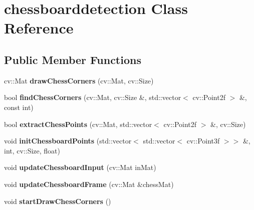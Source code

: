 \hypertarget{classchessboarddetection}{}\section{chessboarddetection Class Reference}
\label{classchessboarddetection}
\subsection*{Public Member Functions}
\begin{DoxyCompactItemize}
\item 
\mbox{\label{classchessboarddetection_a97a4a30faf0bc990686236cd20d060f7}} 
cv\+::\+Mat {\bfseries draw\+Chess\+Corners} (cv\+::\+Mat, cv\+::\+Size)
\item 
\mbox{\label{classchessboarddetection_abc71ee623021de8ec3e937ceba2decf6}} 
bool {\bfseries find\+Chess\+Corners} (cv\+::\+Mat, cv\+::\+Size \&, std\+::vector$<$ cv\+::\+Point2f $>$ \&, const int)
\item 
\mbox{\label{classchessboarddetection_ac99285780391f2803536cb1177a6b951}} 
bool {\bfseries extract\+Chess\+Points} (cv\+::\+Mat, std\+::vector$<$ cv\+::\+Point2f $>$ \&, cv\+::\+Size)
\item 
\mbox{\label{classchessboarddetection_a5c646bf4acc8967358448aac7cfe5f16}} 
void {\bfseries init\+Chessboard\+Points} (std\+::vector$<$ std\+::vector$<$ cv\+::\+Point3f $>$$>$ \&, int, cv\+::\+Size, float)
\item 
\mbox{\label{classchessboarddetection_a0c48bc927ef7caec1e049fca3a1ecbf3}} 
void {\bfseries update\+Chessboard\+Input} (cv\+::\+Mat in\+Mat)
\item 
\mbox{\label{classchessboarddetection_a26c7ffac178495467c64eee54e82ae7b}} 
void {\bfseries update\+Chessboard\+Frame} (cv\+::\+Mat \&chess\+Mat)
\item 
\mbox{\label{classchessboarddetection_afd6c4ed618830c083227edeb0625cc68}} 
void {\bfseries start\+Draw\+Chess\+Corners} ()
\item 
$$
\end{DoxyCompactItemize}
